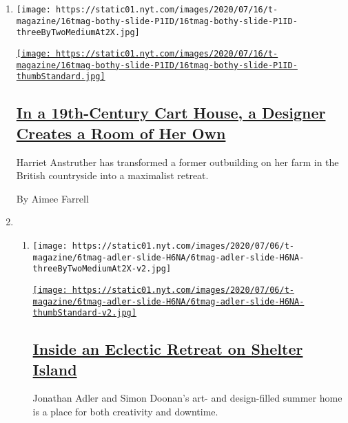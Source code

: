 \begin{enumerate}
\def\labelenumi{\arabic{enumi}.}
\item
  \texttt{[image: https://static01.nyt.com/images/2020/07/16/t-magazine/16tmag-bothy-slide-P1ID/16tmag-bothy-slide-P1ID-threeByTwoMediumAt2X.jpg]}

  \href{/2020/07/31/t-magazine/design-bothy-anstruther.html}{\texttt{[image: https://static01.nyt.com/images/2020/07/16/t-magazine/16tmag-bothy-slide-P1ID/16tmag-bothy-slide-P1ID-thumbStandard.jpg]}}

  \hypertarget{in-a-19th-century-cart-house-a-designer-creates-a-room-of-her-own}{%
  \subsection{\texorpdfstring{\href{/2020/07/31/t-magazine/design-bothy-anstruther.html}{In
  a 19th-Century Cart House, a Designer Creates a Room of Her
  Own}}{In a 19th-Century Cart House, a Designer Creates a Room of Her Own}}\label{in-a-19th-century-cart-house-a-designer-creates-a-room-of-her-own}}

  Harriet Anstruther has transformed a former outbuilding on her farm in
  the British countryside into a maximalist retreat.

  By Aimee Farrell
\item
  \begin{enumerate}
  \def\labelenumii{\arabic{enumii}.}
  \item
    \texttt{[image: https://static01.nyt.com/images/2020/07/06/t-magazine/6tmag-adler-slide-H6NA/6tmag-adler-slide-H6NA-threeByTwoMediumAt2X-v2.jpg]}

    \href{/2020/07/10/t-magazine/jonathan-adler-simon-doonan-home.html}{\texttt{[image: https://static01.nyt.com/images/2020/07/06/t-magazine/6tmag-adler-slide-H6NA/6tmag-adler-slide-H6NA-thumbStandard-v2.jpg]}}

    \hypertarget{inside-an-eclectic-retreat-on-shelter-island}{%
    \subsection{\texorpdfstring{\href{/2020/07/10/t-magazine/jonathan-adler-simon-doonan-home.html}{Inside
    an Eclectic Retreat on Shelter
    Island}}{Inside an Eclectic Retreat on Shelter Island}}\label{inside-an-eclectic-retreat-on-shelter-island}}

    Jonathan Adler and Simon Doonan's art- and design-filled summer home
    is a place for both creativity and downtime.


\end{enumerate}
\end{enumerate}
